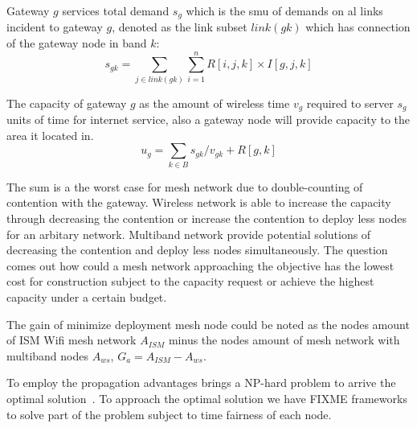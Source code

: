 Gateway $g$ services total demand $s_g$ which is the smu of demands on al links incident to gateway $g$, denoted as the link subset $link(gk)$ which has connection of the gateway node in band $k$:
\begin{equation}
s_{gk}=\sum_{j\in link(gk)} \sum_{i=1}^n R[i,j,k]\times I[g,j,k]
\end{equation}
 
The capacity of gateway $g$ as the amount of wireless time $v_g$ required to server $s_g$ units of time for internet service, also a gateway node will provide capacity to the area it located in.
\begin{equation}
u_{g}=\sum_{k\in B} s_{gk}/v_{gk}+R[g,k]
\end{equation}

The sum is a the worst case for mesh network due to double-counting of contention with the gateway.
Wireless network is able to increase the capacity through decreasing the contention or increase the contention to deploy less nodes for an arbitary network. 
Multiband network provide potential solutions of decreasing the contention and deploy less nodes simultaneously. 
The question comes out how could a mesh network approaching the objective has the lowest cost for construction subject to the capacity request or achieve the highest capacity under a certain budget.


The gain of minimize deployment mesh node could be noted as the nodes amount of ISM Wifi mesh network $A_{ISM}$ minus the nodes amount of mesh network with multiband nodes $A_{ws}$, $G_a=A_{ISM}-A_{ws}$.

To employ the propagation advantages brings a NP-hard problem to arrive the optimal solution~\cite{arkoulis2013optimal}. 
To approach the optimal solution we have FIXME frameworks to solve part of the problem subject to time fairness of each node.

